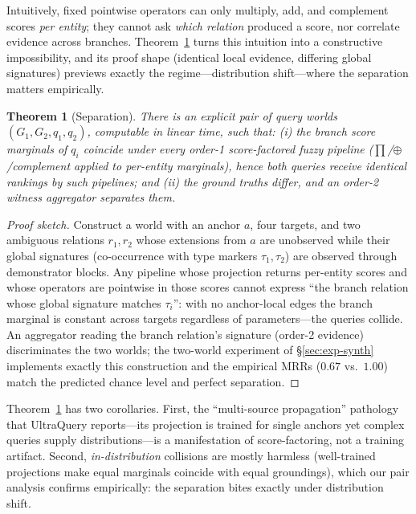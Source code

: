 \documentclass[journal]{IEEEtran}
\newtheorem{theorem}{Theorem}
\begin{document}
Intuitively, fixed pointwise operators can only multiply, add, and
complement scores \emph{per entity}; they cannot ask \emph{which
relation} produced a score, nor correlate evidence across branches.
Theorem~\ref{thm:sep} turns this intuition into a constructive
impossibility, and its proof shape (identical local evidence, differing
global signatures) previews exactly the regime---distribution shift---where
the separation matters empirically.

\begin{theorem}[Separation]\label{thm:sep}
There is an explicit pair of query worlds $(G_1,G_2,q_1,q_2)$, computable in
linear time, such that: (i) the branch score marginals of $q_i$ coincide
under every order-1 score-factored fuzzy pipeline
($\prod$/$\oplus$/complement applied to per-entity marginals), hence both
queries receive identical rankings by such pipelines; and (ii) the ground
truths differ, and an order-2 witness aggregator separates them.
\end{theorem}
\begin{proof}[Proof sketch]
Construct a world with an anchor $a$, four targets, and two ambiguous
relations $r_1,r_2$ whose extensions from $a$ are unobserved while their
global signatures (co-occurrence with type markers $\tau_1,\tau_2$) are
observed through demonstrator blocks. Any pipeline whose projection returns
per-entity scores and whose operators are pointwise in those scores cannot
express ``the branch relation whose global signature matches
$\tau_i$'': with no anchor-local edges the branch marginal is constant
across targets regardless of parameters---the queries collide. An
aggregator reading the branch relation's signature (order-2 evidence)
discriminates the two worlds; the two-world experiment of
\S\ref{sec:exp-synth} implements exactly this construction and the
empirical MRRs ($0.67$ vs.\ $1.00$) match the predicted chance level and
perfect separation.
\end{proof}

Theorem~\ref{thm:sep} has two corollaries. First, the ``multi-source
propagation'' pathology that UltraQuery reports---its projection is
trained for single anchors yet complex queries supply distributions---is a
manifestation of score-factoring, not a training artifact. Second,
\emph{in-distribution} collisions are mostly harmless (well-trained
projections make equal marginals coincide with equal groundings), which our
pair analysis confirms empirically: the separation bites exactly under
distribution shift.
\end{document}
